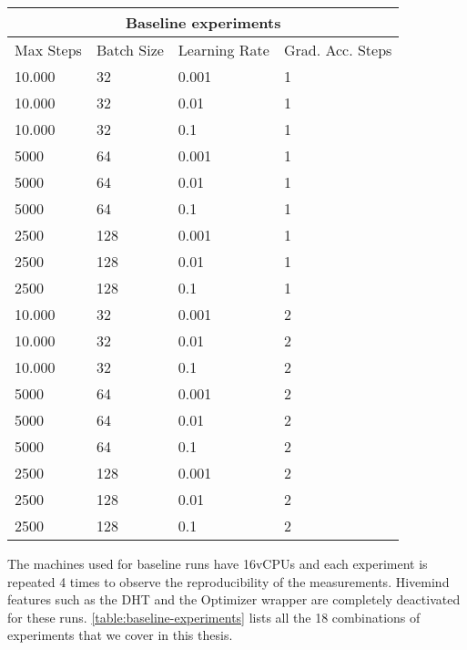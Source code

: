 \begin{tabularx}{\linewidth}{ |p{3cm}|p{3cm}|p{3cm}|p{3cm}|  }
    \caption{
        List of baseline experiments and hyperparameters
    }\label{table:baseline-experiments}                       \\
    \hline
    \multicolumn{4}{|c|}{Baseline experiments}                \\
    \hline
    Max Steps & Batch Size & Learning Rate & Grad. Acc. Steps \\
    \hline
    10.000    & 32         & 0.001         & 1                \\
    10.000    & 32         & 0.01          & 1                \\
    10.000    & 32         & 0.1           & 1                \\
    5000      & 64         & 0.001         & 1                \\
    5000      & 64         & 0.01          & 1                \\
    5000      & 64         & 0.1           & 1                \\
    2500      & 128        & 0.001         & 1                \\
    2500      & 128        & 0.01          & 1                \\
    2500      & 128        & 0.1           & 1                \\
    \hline
    10.000    & 32         & 0.001         & 2                \\
    10.000    & 32         & 0.01          & 2                \\
    10.000    & 32         & 0.1           & 2                \\
    5000      & 64         & 0.001         & 2                \\
    5000      & 64         & 0.01          & 2                \\
    5000      & 64         & 0.1           & 2                \\
    2500      & 128        & 0.001         & 2                \\
    2500      & 128        & 0.01          & 2                \\
    2500      & 128        & 0.1           & 2                \\
    \hline
\end{tabularx}

The machines used for baseline runs have 16vCPUs and each experiment is repeated 4 times to observe the reproducibility of the measurements.
Hivemind features such as the DHT and the Optimizer wrapper are completely deactivated for these runs.
\autoref{table:baseline-experiments} lists all the 18 combinations of experiments that we cover in this thesis.

